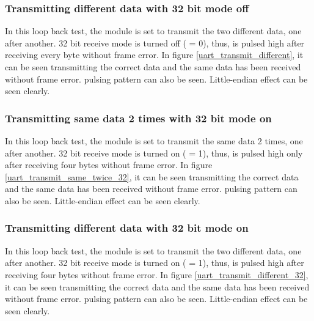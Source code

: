 \subsubsection{Transmitting different data with 32 bit mode off}
In this loop back test, the module is set to transmit the two different data, one after another. 32 bit receive mode is turned off ( = 0), thus,  is pulsed high after receiving every byte without frame error. In figure \ref{uart_transmit_different}, it can be seen transmitting the correct data and the same data has been received without frame error.  pulsing pattern can also be seen. Little-endian effect can be seen clearly.


\subsubsection{Transmitting same data 2 times with 32 bit mode on}
In this loop back test, the module is set to transmit the same data 2 times, one after another. 32 bit receive mode is turned on ( = 1), thus,  is pulsed high only after receiving four bytes without frame error. In figure \ref{uart_transmit_same_twice_32}, it can be seen transmitting the correct data and the same data has been received without frame error.  pulsing pattern can also be seen. Little-endian effect can be seen clearly.


\subsubsection{Transmitting different data with 32 bit mode on}
In this loop back test, the module is set to transmit the two different data, one after another. 32 bit receive mode is turned on ( = 1), thus,  is pulsed high after receiving four bytes without frame error. In figure \ref{uart_transmit_different_32}, it can be seen transmitting the correct data and the same data has been received without frame error.  pulsing pattern can also be seen. Little-endian effect can be seen clearly.

